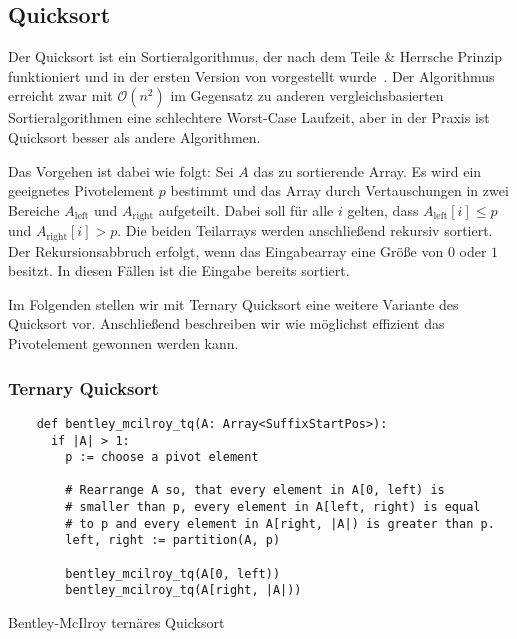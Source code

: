 \subsection{Quicksort}
\label{section:quicksort}

Der  Quicksort ist ein Sortieralgorithmus,
der nach dem Teile \& Herrsche Prinzip funktioniert und
in der ersten Version von  vorgestellt wurde~\cite{quicksort}.
Der Algorithmus erreicht zwar mit $\mathcal O(n^2)$ im Gegensatz zu anderen
vergleichsbasierten Sortieralgorithmen eine schlechtere Worst-Case Laufzeit,
aber in der Praxis ist Quicksort besser als andere Algorithmen.

Das Vorgehen ist dabei wie folgt: Sei $A$ das zu sortierende Array.
Es wird ein geeignetes Pivotelement $p$ bestimmt und das Array durch Vertauschungen in
zwei Bereiche $A_{\text{left}}$ und $A_{\text{right}}$ aufgeteilt.
Dabei soll für alle $i$ gelten, dass $A_{\text{left}}[i] \le p$ und $A_{\text{right}}[i] > p$.
Die beiden Teilarrays werden anschließend rekursiv sortiert.
Der Rekursionsabbruch erfolgt, wenn das Eingabearray eine Größe von $0$ oder $1$ besitzt.
In diesen Fällen ist die Eingabe bereits sortiert.

Im Folgenden stellen wir mit Ternary Quicksort eine weitere Variante des Quicksort vor.
Anschließend beschreiben wir wie möglichst effizient das Pivotelement gewonnen werden kann.

\subsubsection{Ternary Quicksort}
\label{section:ternary_quicksort}

\begin{listing}[!t]
    \begin{verbatim}
    def bentley_mcilroy_tq(A: Array<SuffixStartPos>):
      if |A| > 1:
        p := choose a pivot element
    
        # Rearrange A so, that every element in A[0, left) is
        # smaller than p, every element in A[left, right) is equal
        # to p and every element in A[right, |A|) is greater than p.
        left, right := partition(A, p)
    
        bentley_mcilroy_tq(A[0, left))
        bentley_mcilroy_tq(A[right, |A|))
    \end{verbatim}
    \caption{Bentley-McIlroy ternäres Quicksort~\cite{ternary_quicksort}}
\end{listing}    

